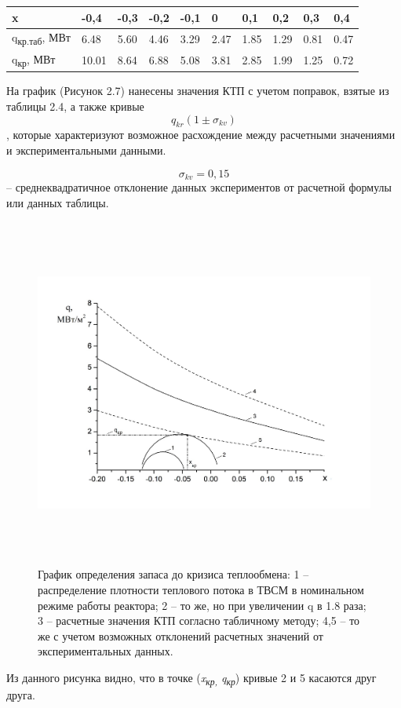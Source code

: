 \begin{longtable}[]{@{}llllllllll@{}}
\toprule
x & -0,4 & -0,3 & -0,2 & -0,1 & 0 & 0,1 & 0,2 & 0,3 & 0,4\tabularnewline
\midrule
\endhead
q\textsubscript{кр.таб}, МВт & 6.48 & 5.60 & 4.46 & 3.29 & 2.47 & 1.85 &
1.29 & 0.81 & 0.47\tabularnewline
q\textsubscript{кр}, МВт & 10.01 & 8.64 & 6.88 & 5.08 & 3.81 & 2.85 &
1.99 & 1.25 & 0.72\tabularnewline
\bottomrule
\end{longtable}

На график (Рисунок 2.7) нанесены значения КТП с учетом поправок, взятые
из таблицы 2.4, а также кривые
\[q_{kr}\left( 1 \pm \sigma_{kv} \right)\], которые характеризуют
возможное расхождение между расчетными значениями и экспериментальными
данными.

\[\sigma_{kv} = 0,15\] -- среднеквадратичное отклонение данных
экспериментов от расчетной формулы или данных таблицы.

\begin{figure}[!h]
\center
\includegraphics[width=6.49583in,height=4.53750in]{media/image11.png}
\caption{График определения запаса до кризиса теплообмена: 1 --
распределение плотности теплового потока в ТВСМ в номинальном режиме
работы реактора; 2 -- то же, но при увеличении q в 1.8 раза; 3 --
расчетные значения КТП согласно табличному методу; 4,5 -- то же с учетом
возможных отклонений расчетных значений от экспериментальных данных.}
\end{figure}

Из данного рисунка видно, что в точке (\emph{x\textsubscript{кр,}
q\textsubscript{кр}}) кривые 2 и 5 касаются друг друга.

